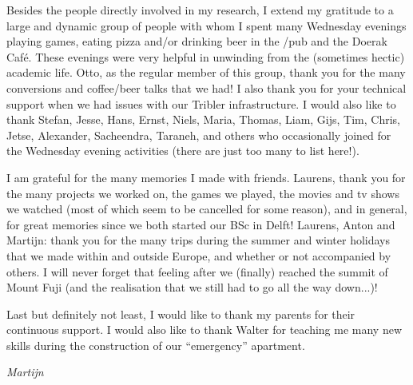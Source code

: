 Besides the people directly involved in my research, I extend my gratitude to a large and dynamic group of people with whom I spent many Wednesday evenings playing games, eating pizza and/or drinking beer in the /pub and the Doerak Café.
These evenings were very helpful in unwinding from the (sometimes hectic) academic life.
Otto, as the regular member of this group, thank you for the many conversions and coffee/beer talks that we had!
I also thank you for your technical support when we had issues with our Tribler infrastructure.
I would also like to thank Stefan, Jesse, Hans, Ernst, Niels, Maria, Thomas, Liam, Gijs, Tim, Chris, Jetse, Alexander, Sacheendra, Taraneh, and others who occasionally joined for the Wednesday evening activities (there are just too many to list here!).

I am grateful for the many memories I made with friends.
Laurens, thank you for the many projects we worked on, the games we played, the movies and tv shows we watched (most of which seem to be cancelled for some reason), and in general, for great memories since we both started our BSc in Delft!
Laurens, Anton and Martijn: thank you for the many trips during the summer and winter holidays that we made within and outside Europe, and whether or not accompanied by others.
I will never forget that feeling after we (finally) reached the summit of Mount Fuji (and the realisation that we still had to go all the way down...)!\emojifuji{}

Last but definitely not least, I would like to thank my parents for their continuous support.
I would also like to thank Walter for teaching me many new skills during the construction of our \enquote{emergency} apartment.

\begin{flushright}
{\makeatletter\itshape
    Martijn
\makeatother}
\end{flushright}
